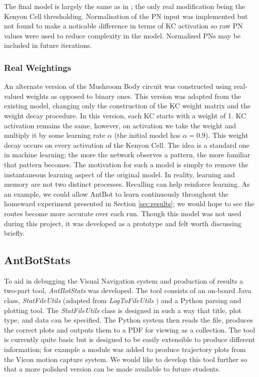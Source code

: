 \documentclass[a4paper,12pt,twoside,openright]{article}
\begin{document}
The final model is largely the same as in \cite{Eberding2016}; the only real modification being the Kenyon Cell thresholding.
Normalisation of the PN input was implemented but not found to make a noticable difference in terms of KC activation so raw
PN values were used to reduce complexity in the model. Normalised PNs may be included in future iterations.

\subsubsection{Real Weightings}
An alternate version of the Mushroom Body circuit was constructed using real-valued weights as opposed to binary ones. This
version was adapted from the existing model, changing only the construction of the KC weight matrix and the weight decay procedure.
In this version, each KC starts with a weight of 1. KC activation remains the same, however, on activation we take the weight and
multiply it by some learning rate $\alpha$ (the initial model has $\alpha = 0.9$). This weight decay occurs on every activation of the Kenyon Cell. The idea is
a standard one in machine learning; the more the network observes a pattern, the more familiar that pattern becomes. The motivation
for such a model is simply to remove the instantaneous learning aspect of the original model. In reality, learning and memory are
not two distinct processes. Recalling can help reinforce learning. As an example, we could allow AntBot to learn continuously throughout
the homeward experiment presented in Section \ref{sec:results}; we would hope to see the routes become more accurate over each run. Though
this model was not used during this project, it was developed as a prototype and felt worth discussing briefly.

\subsection{AntBotStats}\label{sec:abs}
To aid in debugging the Visual Navigation system and production of results a two-part tool, \textit{AntBotStats} was developed.
The tool consists of an on-board Java class, \textit{StatFileUtils} (adapted from \textit{LogToFileUtils} \cite{Zhang2017}) and a
Python parsing and plotting tool. The \textit{StatFileUtils} class is designed in such a way that title, plot type, and data can be
specified. The Python system then reads the file, produces the correct plots and outputs them to a PDF for viewing as a collection.
The tool is currently quite basic but is designed to be easily extensible to produce different information; for example a module was
added to produce trajectory plots from the Vicon motion capture system. We would like to develop this tool further so that a more
polished version can be made available to future students.
\newpage
\end{document}
